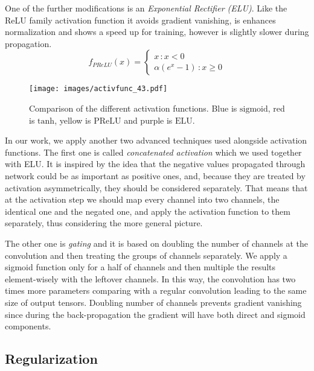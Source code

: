 One of the further modifications is an \emph{Exponential Rectifier (ELU)}.
Like the ReLU family activation function it avoids gradient vanishing, is enhances normalization and shows a speed up for training\cite{bibl:elu}, however is slightly slower during propagation. 
\[ f_{PReLU}(x) = 
\begin{cases}
x \, :x<0 \\
\alpha(e^{x}-1) \, : x \geq 0
\end{cases}
\]

\begin{figure}[h]
	\centering
	\texttt{[image: images/activfunc\_43.pdf]}
	\caption{Comparison of the different activation functions. Blue is $\mathrm{sigmoid}$, red is $\mathrm{tanh}$, yellow is $\mathrm{PReLU}$ and purple is $\mathrm{ELU}$.}
	\label{fig:act_func}
\end{figure}


In our work, we apply another two advanced techniques used alongside activation functions.
The first one is called \emph{concatenated activation} which we used together with ELU.
It is inspired by the idea that the negative values propagated through network could be as important as positive ones, and, because they are treated by activation asymmetrically, they should be considered separately\cite{bibl:concat_rectif}.
That means that at the activation step we should map every channel into two channels, the identical one and the negated one, and apply the activation function to them separately, thus considering the more general picture.
\medskip

The other one is \emph{gating} and it is based on doubling the number of channels at the convolution and then treating the groups of channels separately.
We apply a sigmoid function only for a half of channels and then multiple the results element-wisely with the leftover channels.
In this way, the convolution has two times more parameters comparing with a regular convolution leading to the same size of output tensors.
Doubling number of channels prevents gradient vanishing since during the back-propagation the gradient will have both direct and sigmoid components\cite{bibl:conv_gating}. 

\subsection{Regularization}

